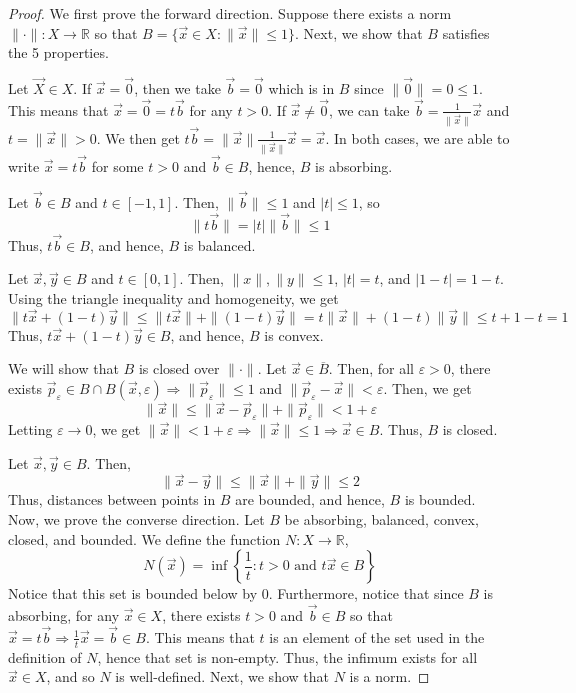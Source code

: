 \documentclass{article}
\renewcommand{\implies}{\Rightarrow}
\newcommand{\R}{\mathbb{R}}
\newcommand{\cl}[1]{\overline{#1}}
\theoremstyle{plain} %
\numberwithin{thm}{section} %
\theoremstyle{definition} %
\begin{document}
\begin{proof}
We first prove the forward direction. Suppose there exists a norm $\|\cdot\|: X \to \R$ so that $B = \{\vec{x} \in X: \|\vec{x}\| \leq 1\}$. Next, we show that $B$ satisfies the 5 properties.

 Let $\vec{X} \in X$. If $\vec{x} = \vec{0}$, then we take $\vec{b} = \vec{0}$ which is in $B$ since $\|\vec{0}\| = 0 \leq 1$. This means that $\vec{x} = \vec{0} = t\vec{b}$ for any $t > 0$. If $\vec{x} \neq \vec{0}$, we can take $\vec{b} = \frac{1}{\|\vec{x}\|}\vec{x}$ and $t = \|\vec{x}\| > 0$. We then get $t\vec{b} = \|\vec{x}\|\frac{1}{\|\vec{x}\|}\vec{x} = \vec{x}$. In both cases, we are able to write $\vec{x} = t\vec{b}$ for some $t > 0$ and $\vec{b} \in B$, hence, $B$ is absorbing.

 Let $\vec{b} \in B$ and $t \in [-1, 1]$. Then, $\|\vec{b}\| \leq 1$ and $|t| \leq 1$, so
\[
    \|t\vec{b}\| = |t|\|\vec{b}\| \leq 1
\]
Thus, $t\vec{b} \in B$, and hence, $B$ is balanced.

 Let $\vec{x}, \vec{y} \in B$ and $t \in [0, 1]$. Then, $\|x\|, \|y\| \leq 1$, $|t| = t$, and $|1 - t| = 1 - t$. Using the triangle inequality and homogeneity, we get
\[
    \|t\vec{x} + (1 - t)\vec{y}\| \leq \|t\vec{x}\| + \|(1 - t)\vec{y}\| = t\|\vec{x}\| + (1 - t)\|\vec{y}\| \leq t + 1 - t = 1
\]
Thus, $t\vec{x} + (1 - t)\vec{y} \in B$, and hence, $B$ is convex.

 We will show that $B$ is closed over $\|\cdot\|$. Let $\vec{x} \in \cl{B}$. Then, for all $\varepsilon > 0$, there exists $\vec{p}_\varepsilon \in B \cap B(\vec{x}, \varepsilon) \implies \|\vec{p}_\varepsilon\| \leq 1$ and $\|\vec{p}_\varepsilon - \vec{x}\| < \varepsilon$. Then, we get
\[
    \|\vec{x}\| \leq \|\vec{x} - \vec{p}_\varepsilon\| + \|\vec{p}_\varepsilon\| < 1 + \varepsilon
\]
Letting $\varepsilon \to 0$, we get $\|\vec{x}\| < 1 + \varepsilon \implies \|\vec{x}\| \leq 1 \implies \vec{x} \in B$. Thus, $B$ is closed.

 Let $\vec{x}, \vec{y} \in B$. Then,
\[
    \|\vec{x} - \vec{y}\| \leq \|\vec{x}\| + \|\vec{y}\| \leq 2
\]
Thus, distances between points in $B$ are bounded, and hence, $B$ is bounded.\\

Now, we prove the converse direction. Let $B$ be absorbing, balanced, convex, closed, and bounded. We define the function $N: X \to \R$, 
\[
N(\vec{x}) = \inf\left\{\frac{1}{t}: t > 0 \text{ and } t\vec{x} \in B\right\}
\]
Notice that this set is bounded below by 0. Furthermore, notice that since $B$ is absorbing, for any $\vec{x} \in X$, there exists $t > 0$ and $\vec{b} \in B$ so that $\vec{x} = t\vec{b} \implies \frac{1}{t}\vec{x} = \vec{b} \in B$. This means that $t$ is an element of the set used in the definition of $N$, hence that set is non-empty. Thus, the infimum exists for all $\vec{x} \in X$, and so $N$ is well-defined. Next, we show that $N$ is a norm.


\end{proof}
\end{document}
